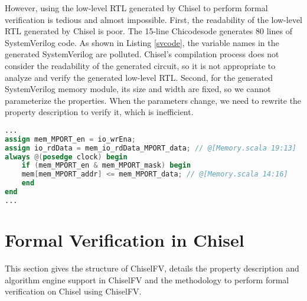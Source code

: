 \documentclass[conference]{IEEEtran}
\theoremstyle{definition}
\begin{document}
However, using the low-level RTL generated by Chisel to perform formal verification is tedious and almost impossible. 
First, the readability of the low-level RTL generated by Chisel is poor. The 15-line Chicodesode generates 80 lines of SystemVerilog code. As shown in Listing \ref{svcode}, the variable names in the generated SystemVerilog are polluted. Chisel's compilation process does not consider the readability of the generated circuit, so it is not appropriate to analyze and verify the generated low-level RTL.
Second, for the generated SystemVerilog memory module, its size and width are fixed, so we cannot parameterize the properties. When the parameters change, we need to rewrite the property description to verify it, which is inefficient. 

\begin{lstlisting}[language=Verilog, caption={A SystemVerilog code fragment generated by Chisel}, label={svcode}]
...
assign mem_MPORT_en = io_wrEna;
assign io_rdData = mem_io_rdData_MPORT_data; // @[Memory.scala 19:13]
always @(posedge clock) begin
    if (mem_MPORT_en & mem_MPORT_mask) begin
    mem[mem_MPORT_addr] <= mem_MPORT_data; // @[Memory.scala 14:16]
    end
end
...
\end{lstlisting}

\section{Formal Verification in Chisel}

This section gives the structure of ChiselFV, details the property description and algorithm engine support in ChiselFV and the methodology to perform formal verification on Chisel using ChiselFV.






\end{document}
